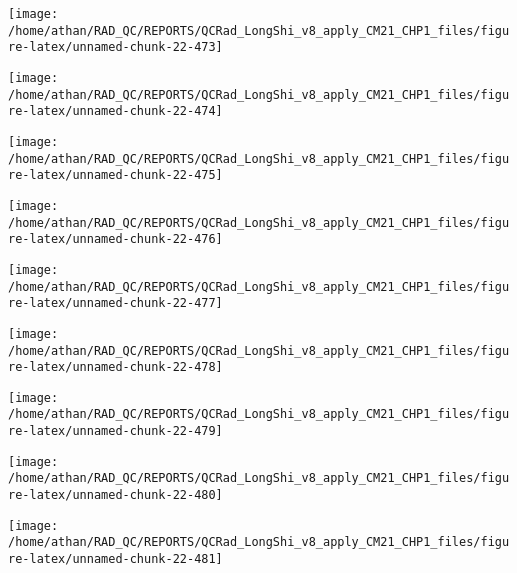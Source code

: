 \documentclass[
  10pt,
  a4paper,oneside]{article}
\begin{document}
\begin{center}\texttt{[image: /home/athan/RAD\_QC/REPORTS/QCRad\_LongShi\_v8\_apply\_CM21\_CHP1\_files/figure-latex/unnamed-chunk-22-473]} \end{center}

\begin{center}\texttt{[image: /home/athan/RAD\_QC/REPORTS/QCRad\_LongShi\_v8\_apply\_CM21\_CHP1\_files/figure-latex/unnamed-chunk-22-474]} \end{center}

\begin{center}\texttt{[image: /home/athan/RAD\_QC/REPORTS/QCRad\_LongShi\_v8\_apply\_CM21\_CHP1\_files/figure-latex/unnamed-chunk-22-475]} \end{center}

\begin{center}\texttt{[image: /home/athan/RAD\_QC/REPORTS/QCRad\_LongShi\_v8\_apply\_CM21\_CHP1\_files/figure-latex/unnamed-chunk-22-476]} \end{center}

\begin{center}\texttt{[image: /home/athan/RAD\_QC/REPORTS/QCRad\_LongShi\_v8\_apply\_CM21\_CHP1\_files/figure-latex/unnamed-chunk-22-477]} \end{center}

\begin{center}\texttt{[image: /home/athan/RAD\_QC/REPORTS/QCRad\_LongShi\_v8\_apply\_CM21\_CHP1\_files/figure-latex/unnamed-chunk-22-478]} \end{center}

\begin{center}\texttt{[image: /home/athan/RAD\_QC/REPORTS/QCRad\_LongShi\_v8\_apply\_CM21\_CHP1\_files/figure-latex/unnamed-chunk-22-479]} \end{center}

\begin{center}\texttt{[image: /home/athan/RAD\_QC/REPORTS/QCRad\_LongShi\_v8\_apply\_CM21\_CHP1\_files/figure-latex/unnamed-chunk-22-480]} \end{center}

\begin{center}\texttt{[image: /home/athan/RAD\_QC/REPORTS/QCRad\_LongShi\_v8\_apply\_CM21\_CHP1\_files/figure-latex/unnamed-chunk-22-481]} \end{center}
\end{document}

